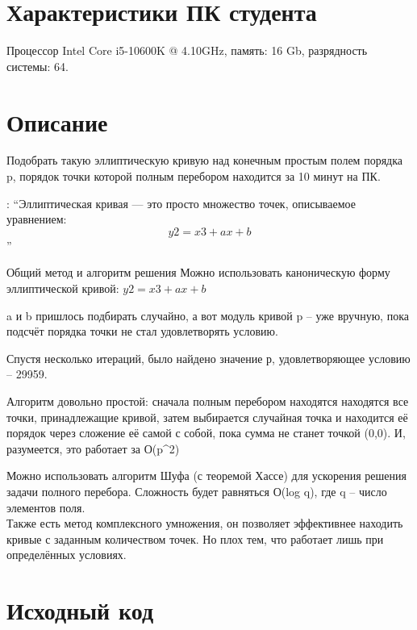 \section{Характеристики ПК студента}

Процессор Intel Core i5-10600K @ 4.10GHz, память: 16 Gb, разрядность системы: 64.

\section{Описание}

Подобрать такую эллиптическую кривую над конечным простым полем порядка p, порядок точки которой полным перебором находится за 10 минут на ПК.

\cite{elipt_cri}: \enquote{Эллиптическая кривая — это просто множество точек, описываемое уравнением:\\
$$y2 = x3 + ax + b$$}

Общий метод и алгоритм решения
Можно использовать каноническую форму эллиптической кривой:
$y2 = x3 + ax + b$

a и b пришлось подбирать случайно, а вот модуль кривой p – уже вручную, пока 
подсчёт порядка точки не стал удовлетворять условию.  


Спустя несколько итераций, было найдено значение р, удовлетворяющее условию – 29959.

Алгоритм довольно простой: сначала полным перебором находятся  находятся все точки, принадлежащие кривой, затем выбирается случайная точка и находится её порядок через сложение её самой с собой, пока сумма не станет точкой (0,0). И, разумеется, это работает за О(p^2)





Можно использовать алгоритм Шуфа (с теоремой Хассе) для ускорения решения задачи полного перебора. Сложность будет равняться О(log q), где q – число элементов поля. \\

Также есть метод комплексного умножения, он  позволяет эффективнее находить кривые с заданным количеством точек. Но плох тем, что работает лишь при определённых условиях.




\pagebreak

\section{Исходный код}


